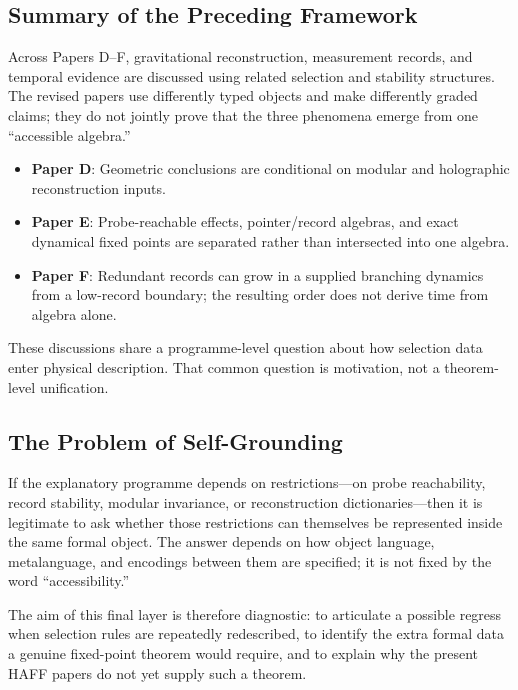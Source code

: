 \documentclass[12pt,a4paper]{article}
\begin{document}
\subsection{Summary of the Preceding Framework}

Across Papers D--F, gravitational reconstruction, measurement records, and temporal evidence are discussed using related selection and stability structures.  The revised papers use differently typed objects and make differently graded claims; they do not jointly prove that the three phenomena emerge from one ``accessible algebra.''

\begin{itemize}
    \item \textbf{Paper D}: Geometric conclusions are conditional on modular and holographic reconstruction inputs.
    \item \textbf{Paper E}: Probe-reachable effects, pointer/record algebras, and exact dynamical fixed points are separated rather than intersected into one algebra.
    \item \textbf{Paper F}: Redundant records can grow in a supplied branching dynamics from a low-record boundary; the resulting order does not derive time from algebra alone.
\end{itemize}

These discussions share a programme-level question about how selection data enter physical description.  That common question is motivation, not a theorem-level unification.

\subsection{The Problem of Self-Grounding}

If the explanatory programme depends on restrictions---on probe reachability, record stability, modular invariance, or reconstruction dictionaries---then it is legitimate to ask whether those restrictions can themselves be represented inside the same formal object.  The answer depends on how object language, metalanguage, and encodings between them are specified; it is not fixed by the word ``accessibility.''

The aim of this final layer is therefore diagnostic: to articulate a possible regress when selection rules are repeatedly redescribed, to identify the extra formal data a genuine fixed-point theorem would require, and to explain why the present HAFF papers do not yet supply such a theorem.
\end{document}
